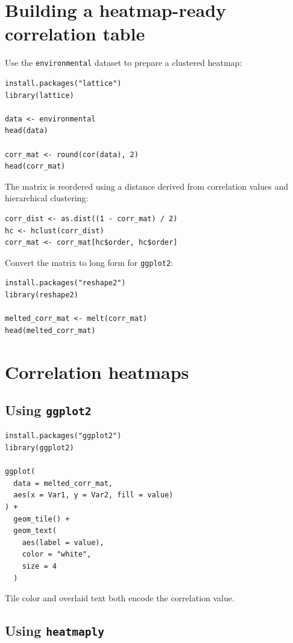 \section{Building a heatmap-ready correlation table}

Use the \texttt{environmental} dataset to prepare a clustered heatmap:

\begin{lstlisting}[style=dsr]
install.packages("lattice")
library(lattice)

data <- environmental
head(data)

corr_mat <- round(cor(data), 2)
head(corr_mat)
\end{lstlisting}

The matrix is reordered using a distance derived from correlation values and hierarchical clustering:

\begin{lstlisting}[style=dsr]
corr_dist <- as.dist((1 - corr_mat) / 2)
hc <- hclust(corr_dist)
corr_mat <- corr_mat[hc$order, hc$order]
\end{lstlisting}

Convert the matrix to long form for \texttt{ggplot2}:

\begin{lstlisting}[style=dsr]
install.packages("reshape2")
library(reshape2)

melted_corr_mat <- melt(corr_mat)
head(melted_corr_mat)
\end{lstlisting}


\section{Correlation heatmaps}

\subsection{Using \texttt{ggplot2}}

\begin{lstlisting}[style=dsr]
install.packages("ggplot2")
library(ggplot2)

ggplot(
  data = melted_corr_mat,
  aes(x = Var1, y = Var2, fill = value)
) +
  geom_tile() +
  geom_text(
    aes(label = value),
    color = "white",
    size = 4
  )
\end{lstlisting}

Tile color and overlaid text both encode the correlation value.

\subsection{Using \texttt{heatmaply}}

